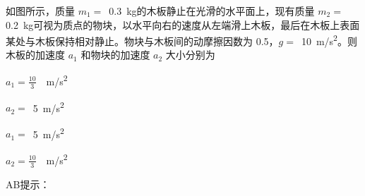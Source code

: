 如图所示，质量 \(m_1 =\) \,\qty{0.3}{kg}的木板静止在光滑的水平面上，现有质量 \(m_2 =\) \,\qty{0.2}{kg}可视为质点的物块，以水平向右的速度从左端滑上木板，最后在木板上表面某处与木板保持相对静止。物块与木板间的动摩擦因数为 0.5，\(g =\) \,\qty{10}{m/s^2}。则木板的加速度 \(a_1\) 和物块的加速度 \(a_2\) 大小分别为\paren[]

\begin{choices}
	\item \(a_1 = \frac{10}{3}\) \,\qty{}{m/s^2}
	\item \(a_2 =\) \,\qty{5}{m/s^2}
	\item \(a_1 =\) \,\qty{5}{m/s^2}
	\item \(a_2 = \frac{10}{3}\) \,\qty{}{m/s^2}
\end{choices}
\begin{answer}
	AB\qquad 提示：
\end{answer}